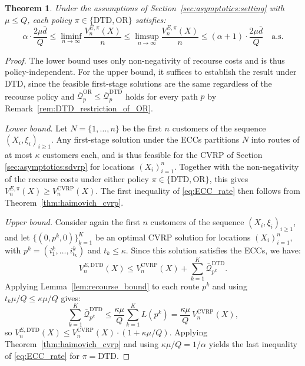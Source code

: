 \documentclass{article}
\newtheorem{theorem}{Theorem}
\begin{document}
{\begin{theorem}\label{thm:ECC_rate}
    Under the assumptions of Section~\ref{sec:asymptotics:setting} with $\mu \leq Q$, each policy $\pi \in \{\text{DTD}, \text{OR}\}$ satisfies:
    \begin{equation}\label{eq:ECC_rate}
        \alpha \cdot \frac{2\mu\bar d}{Q} \leq \liminf_{n \to \infty} \frac{V^{E, \pi}_n(X)}{n} \leq \limsup_{n \to \infty} \frac{V^{E, \pi}_n(X)}{n} \leq (\alpha + 1) \cdot \frac{2\mu\bar d}{Q} \quad \text{a.s.}
    \end{equation}
\end{theorem}

\begin{proof}
    The lower bound uses only non-negativity of recourse costs and is thus policy-independent. For the upper bound, it suffices to establish the result under DTD, since the feasible first-stage solutions are the same regardless of the recourse policy and $\bar{\mathcal{Q}}_p^{\text{OR}} \leq \bar{\mathcal{Q}}_p^{\text{DTD}}$ holds for every path $p$ by Remark~\ref{rem:DTD_restriction_of_OR}.

    \emph{Lower bound.} Let $N = \{1, \dots, n\}$ be the first $n$ customers of the sequence $(X_i, \xi_i)_{i \geq 1}$. Any first-stage solution under the ECCs partitions $N$ into routes of at most $\kappa$ customers each, and is thus feasible for the CVRP of Section \ref{sec:asymptotics:sdvrp} for locations $(X_i)_{i = 1}^n$. Together with the non-negativity of the recourse costs under either policy $\pi \in \{\text{DTD}, \text{OR}\}$, this gives $V^{E, \pi}_n(X) \geq V^{\text{CVRP}}_n(X)$. The first inequality of \eqref{eq:ECC_rate} then follows from Theorem~\ref{thm:haimovich_cvrp}.

    \emph{Upper bound.} Consider again the first $n$ customers of the sequence $(X_i, \xi_i)_{i \geq 1}$, and let $\{(0, p^k, 0)\}_{k=1}^K$ be an optimal CVRP solution for locations $(X_i)_{i=1}^n$, with $p^k = (i^k_1, \dots, i^k_{t_k})$ and $t_k \leq \kappa$. Since this solution satisfies the ECCs, we have:
    \begin{equation}\label{eq:CVRP-DTD}
        V^{E, \text{DTD}}_n(X) \leq V^{\text{CVRP}}_n(X) + \sum_{k=1}^K \bar{\mathcal{Q}}^{\text{DTD}}_{p^k}.
    \end{equation}
    Applying Lemma~\ref{lem:recourse_bound} to each route $p^k$ and using $t_k\mu/Q \leq \kappa\mu/Q$ gives:
    \[
        \sum_{k=1}^K \bar{\mathcal{Q}}^{\text{DTD}}_{p^k} \leq \frac{\kappa\mu}{Q} \sum_{k=1}^K L(p^k) = \frac{\kappa\mu}{Q} \, V^{\text{CVRP}}_n(X),
    \]
    so $V^{E, \text{DTD}}_n(X) \leq V^{\text{CVRP}}_n(X) \cdot (1 + \kappa\mu/Q)$. Applying Theorem~\ref{thm:haimovich_cvrp} and using $\kappa\mu/Q = 1/\alpha$ yields the last inequality of \eqref{eq:ECC_rate} for $\pi = \text{DTD}$.
\end{proof}

}
\end{document}
